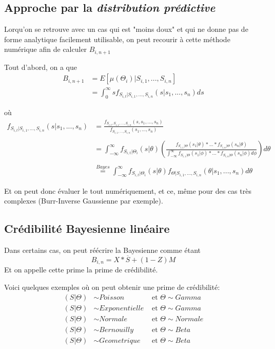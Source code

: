 \documentclass[11pt,french]{report}
\begin{document}
\subsection{ Approche par la \textit{distribution prédictive}}

Lorqu'on se retrouve avec un cas qui est "moins doux" et qui ne donne pas de forme analytique facilement utilisable, on peut recourir à cette méthode numérique afin de calculer $B_{i,n+1}$

Tout d'abord, on a que 
$$\begin{aligned} B_{i,n+1} &= E[\mu(\Theta_i)|S_{i,1},...,S_{i,n}] \\
&= \int_0^{\infty} s f_{S_{i,t}|S_{i,1},...,S_{i,n}}(s|s_1,...,s_n) ds \end{aligned}$$

où
$$\begin{aligned} 
f_{S_{i,t}|S_{i,1},...,S_{i,n}}(s|s_1,...,s_n) &= \frac{f_{S_{i,t},S_{i,1},...,S_{i,n}}(s,s_1,...,s_n)}{f_{S_{i,1},...,S_{i,n}}(s_1,...,s_n)} \\ \\
&= \int_{-\infty}^{\infty} f_{S_{i,t}|\Theta_i}(s|\theta) \left(\frac{f_{S_{i,1}|\Theta}(s_1|\theta)*...*f_{S_{i,n}|\Theta}(s_n|\theta)}{\int_{-\infty}^{\infty} f_{S_{i,1}|\Theta}(s_1|\phi)*...*f_{S_{i,n}|\Theta}(s_n|\phi) d\phi} \right) d\theta \\ \\
&\overset{Bayes}{=} \int_{-\infty}^{\infty} f_{S_{i,t}|\Theta_i}(s|\theta) f_{\Theta|S_{i,1},...,S_{i,n}}(\theta|s_1,...,s_n) d\theta 
\end{aligned}$$

Et on peut donc évaluer le tout numériquement, et ce, même pour des cas très complexes (Burr-Inverse Gaussienne par exemple).

\subsection{Crédibilité Bayesienne linéaire}

Dans certains cas, on peut réécrire la Bayesienne comme étant
$$B_{i,n}=X* \overline{S} + (1-Z)M$$
Et on appelle cette prime la prime de crédibilité.

Voici quelques exemples où on peut obtenir une prime de crédibilité:
$$\begin{aligned}
(S|\Theta) &\sim Poisson &\text{ et } \Theta \sim Gamma \\
(S|\Theta) &\sim Exponentielle &\text{ et } \Theta \sim Gamma \\
(S|\Theta) &\sim Normale &\text{ et } \Theta \sim Normale \\
(S|\Theta) &\sim Bernouilly &\text{ et } \Theta \sim Beta \\
(S|\Theta) &\sim Geometrique &\text{ et } \Theta \sim Beta
\end{aligned}$$
\end{document}
